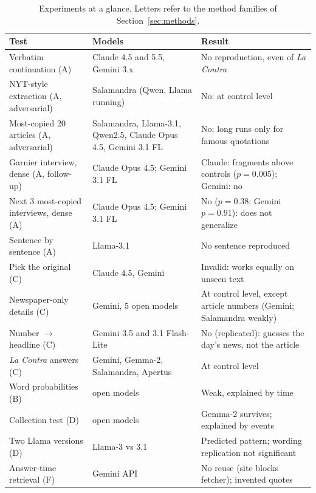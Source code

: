 \documentclass[10pt,a4paper]{article}
\begin{document}
\begin{table}[h]\centering\small
\begin{tabularx}{\linewidth}{>{\raggedright\arraybackslash}p{3.4cm}>{\raggedright\arraybackslash}p{3.2cm}>{\raggedright\arraybackslash}X}
\toprule
Test & Models & Result\\
\midrule
Verbatim continuation (A) & Claude 4.5 and 5.5, Gemini 3.x & No reproduction, even of \emph{La Contra}\\
NYT-style extraction (A, adversarial) & Salamandra (Qwen, Llama running) & No: at control level\\
Most-copied 20 articles (A, adversarial) & Salamandra, Llama-3.1, Qwen2.5, Claude Opus 4.5, Gemini 3.1 FL & No; long runs only for famous quotations\\
Garnier interview, dense (A, follow-up) & Claude Opus 4.5; Gemini 3.1 FL & Claude: fragments above controls ($p=0.005$); Gemini: no\\
Next 3 most-copied interviews, dense (A) & Claude Opus 4.5; Gemini 3.1 FL & No ($p=0.38$; Gemini $p=0.91$): does not generalize\\
Sentence by sentence (A) & Llama-3.1 & No sentence reproduced\\
Pick the original (C) & Claude 4.5, Gemini & Invalid: works equally on unseen text\\
Newspaper-only details (C) & Gemini, 5 open models & At control level, except article numbers (Gemini; Salamandra weakly)\\
Number $\to$ headline (C) & Gemini 3.5 and 3.1 Flash-Lite & No (replicated): guesses the day's news, not the article\\
\emph{La Contra} answers (C) & Gemini, Gemma-2, Salamandra, Apertus & At control level\\
Word probabilities (B) & 4 open models & Weak, explained by time\\
Collection test (D) & 4 open models & Gemma-2 survives; explained by events\\
Two Llama versions (D) & Llama-3 vs 3.1 & Predicted pattern; wording replication not significant\\
Answer-time retrieval (F) & Gemini API & No reuse (site blocks fetcher); invented quotes\\
\bottomrule
\end{tabularx}
\caption{Experiments at a glance. Letters refer to the method families of Section~\ref{sec:methods}.}\label{tab:overview}
\end{table}
\end{document}
